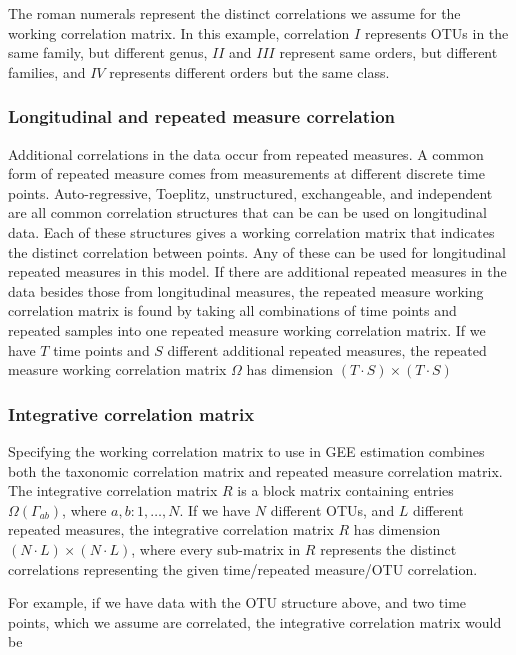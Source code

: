 \documentclass[12pt]{article}
\begin{document}
The roman numerals represent the distinct correlations we assume for the working correlation matrix. In this example, correlation $I$ represents OTUs in the same family, but different genus, $II$ and $III$ represent same orders, but different families, and $IV$ represents different orders but the same class.


\subsubsection{Longitudinal and repeated measure correlation}
Additional correlations in the data occur from repeated measures. A common form of repeated measure comes from measurements at different discrete time points. Auto-regressive, Toeplitz, unstructured, exchangeable, and independent are all common correlation structures that can be can be used on longitudinal data. Each of these structures gives a working correlation matrix that indicates the distinct correlation between points. Any of these can be used for longitudinal repeated measures in this model. If there are additional repeated measures in the data besides those from longitudinal measures, the repeated measure working correlation matrix is found by taking all combinations of time points and repeated samples into one repeated measure working correlation matrix. If we have $T$ time points and $S$ different additional repeated measures, the repeated measure working correlation matrix $\Omega$ has dimension $(T \cdot S) \times (T \cdot S ) $

\subsubsection{Integrative correlation matrix }

Specifying the working correlation matrix to use in GEE estimation combines both the taxonomic correlation matrix and repeated measure correlation matrix. The integrative correlation matrix $R$ is a block matrix containing entries $\Omega(\Gamma_{ab})$, where $a,b: 1, \ldots , N$. If we have $N$ different OTUs, and $L$ different repeated measures, the integrative correlation matrix $R$ has dimension $(N \cdot L) \times (N \cdot L)$, where every sub-matrix in $R$ represents the distinct correlations representing the given time/repeated measure/OTU correlation.

For example, if we have data with the OTU structure above, and two time points, which we assume are correlated, the integrative correlation matrix would be
\end{document}
